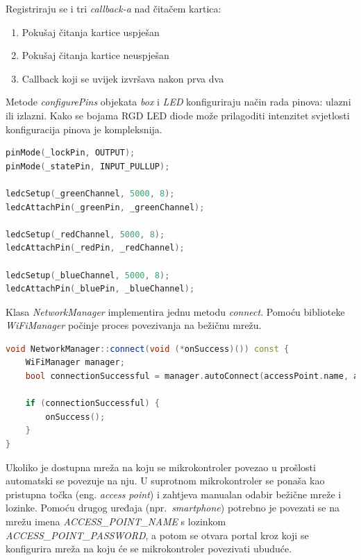 Registriraju se i tri \textit{callback-a} nad čitačem kartica:
\begin{enumerate}
    \item Pokušaj čitanja kartice uspješan
    \item Pokušaj čitanja kartice neuspješan
    \item Callback koji se uvijek izvršava nakon prva dva
\end{enumerate}

Metode \textit{configurePins} objekata \textit{box} i \textit{LED} konfiguriraju način rada pinova: ulazni ili izlazni.
Kako se bojama RGD LED diode može prilagoditi intenzitet svjetlosti konfiguracija pinova je kompleksnija.

\begin{lstlisting}[language=C++]
pinMode(_lockPin, OUTPUT);
pinMode(_statePin, INPUT_PULLUP);

ledcSetup(_greenChannel, 5000, 8);
ledcAttachPin(_greenPin, _greenChannel);

ledcSetup(_redChannel, 5000, 8);
ledcAttachPin(_redPin, _redChannel);

ledcSetup(_blueChannel, 5000, 8);
ledcAttachPin(_bluePin, _blueChannel);
\end{lstlisting}

Klasa \textit{NetworkManager} implementira jednu metodu \textit{connect}.
Pomoću biblioteke \textit{WiFiManager} počinje proces povezivanja na bežičnu mrežu.

\begin{lstlisting}[language=C++]
void NetworkManager::connect(void (*onSuccess)()) const {
    WiFiManager manager;
    bool connectionSuccessful = manager.autoConnect(accessPoint.name, accessPoint.password);

    if (connectionSuccessful) {
        onSuccess();
    }
}
\end{lstlisting}

Ukoliko je dostupna mreža na koju se mikrokontroler povezao u prošlosti automatski se povezuje na nju.
U suprotnom mikrokontroler se ponaša kao pristupna točka (eng. \textit{access point}) i zahtjeva manualan odabir
bežične mreže i lozinke.
Pomoću drugog uređaja (npr.~\textit{smartphone}) potrebno je povezati se na mrežu imena \textit{ACCESS\_POINT\_NAME} s
lozinkom \textit{ACCESS\_POINT\_PASSWORD}, a potom se otvara portal kroz koji se konfigurira mreža na koju će se
mikrokontroler povezivati ubuduće.

